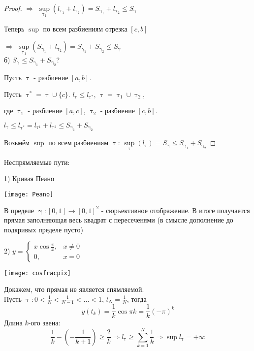 \documentclass[12pt, fleqn]{article}
\begin{document}
\begin{Property}[3]
\begin{Property}[4]
\begin{Property}[2, аддитивность]
\begin{Proof}
\begin{proof}
    $\Rightarrow$ $\sup\limits_{\uptau_1} (l_{\uptau_1} + l_{\uptau_2}) = S_{\upgamma_1} + l_{\uptau_2} \leqslant S_\upgamma$
    
    Теперь $\sup$ по всем разбиениям отрезка $[c,b]$ 
    
    $\Rightarrow$ $\sup\limits_{\uptau_1} (S_{\upgamma_1} + l_{\uptau_2}) = S_{\upgamma_1} + S_{\upgamma_2} \leqslant S_\upgamma$
    \\
    б) $S_\upgamma \leqslant S_{\upgamma_1} + S_{\upgamma_2} ?$
    
    Пусть $\uptau$ - разбиение $[a,b]$. 
    
    Пусть $\uptau^* = \uptau \cup \{c\}$. $l_\uptau \leqslant l_{\uptau^*}$, $\uptau = \uptau_1 \cup \uptau_2$, 
    
    где $\uptau_1$ - разбиение $[a,c]$, $\uptau_2$ - разбиение $[c,b]$.
    
    $l_\uptau \leqslant l_{\uptau^*} = l_{\uptau^1} + l_{\uptau^2} \leqslant S_{\upgamma_1} + S_{\upgamma_2}$
    
    Возьмём $\sup$ по всем разбиениям $\uptau$: $\sup\limits_{\uptau} (l_{\uptau}) = S_\upgamma \leqslant S_{\upgamma_1} + S_{\upgamma_2}$
\end{proof}

\begin{examples}
    Неспрямляемые пути:
    
    1) Кривая Пеано
    
    \texttt{[image: Peano]}
    
    В пределе $\upgamma: [0,1] \rightarrow [0,1]^2$ - сюръективное отображение. В итоге получается прямая заполняющая весь квадрат с пересеченями (в смысле дополнение до подкривых  пределе пусто)
    
    2) $y = 
    \begin{cases}
       x \cos \frac{\pi}{x}, & x \neq 0\\
       0, & x = 0
     \end{cases}$
    
    \texttt{[image: cosfracpix]}
    
    Докажем, что прямая не является спямляемой. 
    \\
    Пусть $\uptau: 0 < \frac{1}{N} < \frac{1}{N -1} < ... < 1$, $t_N = \frac{1}{N}$, тогда 
    \[y(t_k) = \frac{1}{k} \cos \pi k = \frac{1}{k} (-\pi)^k\]
    Длина $k$-ого звена: 
    \[\frac{1}{k} - (-\frac{1}{k+1}) \geqslant \frac{2}{k} \Rightarrow l_\uptau \geqslant \sum\limits_{k=1}^N  \frac{1}{k}\Rightarrow \sup l_\uptau = +\infty\]
\end{examples}


\end{Proof}
\end{Property}
\end{Property}
\end{Property}
\end{document}
